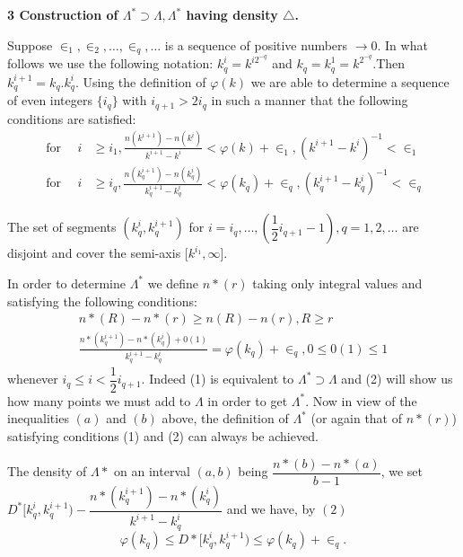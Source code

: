 \noindent
\textbf{3 Construction of $\Lambda^* \supset \Lambda, \Lambda^* $
 having density $\triangle$.} 

Suppose $\in_1, \in_2, \ldots, \in_q, \ldots$
is a sequence of positive numbers $\rightarrow 0$. In what follows we
use the following notation: $k^i_q = k^{i2^{-q}}$ and $k_q = k^1_q =
k^{2^{-q}}$.\pageoriginale Then $k^{i+1}_q = k_q. k^i_q$. Using the definition of
$\varphi (k)$ we are able to determine a sequence of even integers
$\{i_q \}$ with $i_{q+1} > 2i_q$ in such a manner that the following
conditions are satisfied: 
\begin{align*}
 \text{ for }\quad i & \ge i_1, \frac{n(k^{i+1})-n(k^i)}{k^{i+1} - k^i} <
 \varphi (k) + \in_1, (k^{i+1} - k^i)^{-1} < \in_1
 \tag{a}\\ 
 \text{ for }\quad i & \ge i_q, \frac{n(k^{i+1}_{q})-n(k^i_q)}{k^{i+1}_q -
 k^i_q} < \varphi (k_q) + \in_q, (k^{i+1}_q - k^i_q)^{-1}
 < \in_q \tag{b} 
\end{align*}

The set of segments $(k^i_q, k^{i+1}_q)$ for $i = i_q, \ldots,
(\dfrac{1}{2}i_{q+1} - 1), q = 1, 2, \ldots$ are disjoint and cover
the semi-axis [$k^{i_1}, \infty$]. 

In order to determine $\Lambda^*$ we define $n* (r)$ taking only
integral values and satisfying the following conditions: 
\begin{gather*}
 n* (R) - n*(r) \ge n(R) - n(r), R \ge r \tag{1}\\
 \frac{n* (k^{i+1}_q) - n* (k^i_q) + 0(1)}{k^{i+1}_q - k^i_q} =
 \varphi (k_q) + \in_q, 0 \le 0 (1) \le 1 \tag{2} 
\end{gather*}
whenever $i_q \le i < \dfrac{1}{2}i_{q+1}$. Indeed (1) is equivalent
to $\Lambda^* \supset \Lambda$ and (2) will show us how many points
we must add to $\Lambda$ in order to get $\Lambda^*$. Now in view of
the inequalities $(a)$ and $(b)$ above, the definition of $\Lambda^*$
(or again that of $n*(r)$) satisfying conditions (1) and (2) can
always be achieved. 

The density of $\Lambda*$ on an interval $(a,b)$ being $\dfrac{n*(b) -
 n*(a)}{b - 1}$, we set $D^*[k^i_q, k^{i+1}_q) - \dfrac{n*(k^{i+1}_q)
 - n*(k^i_q)}{k^{i+1} - k^i_q}$ and we have, by $(2)$ 
 \begin{equation}
 \varphi (k_q) \le D * [k^i_q, k^{i+1}_q) \le \varphi (k_q) +
  \in_q. \tag{***} 
 \end{equation}

